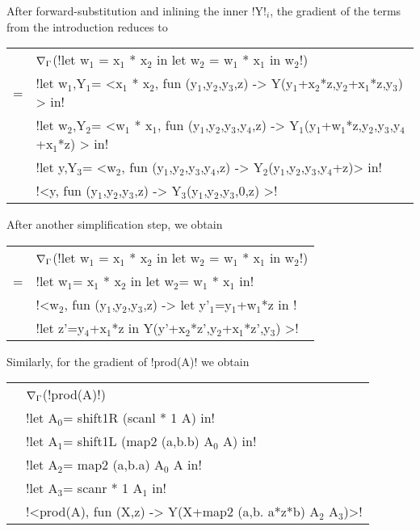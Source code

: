 \begin{example}
    After forward-substitution and inlining the inner !Y!$_{i}$, the gradient of the terms from the introduction reduces to

    \begin{tabular}{c l}
        & $\nabla_\Gamma$(!let w$_{1}$ = x$_{1}$ * x$_{2}$ in let w$_{2}$ = w$_{1}$ * x$_{1}$ in w$_{2}$!) \\
        =& !let w$_1$,Y$_1$= <x$_1$ * x$_{2}$, fun (y$_{1}$,y$_{2}$,y$_{3}$,z) -> Y(y$_{1}$+x$_2$*z,y$_{2}$+x$_1$*z,y$_{3}$) > in! \\
        & !let w$_{2}$,Y$_{2}$= <w$_{1}$ * x$_{1}$, fun (y$_{1}$,y$_{2}$,y$_{3}$,y$_{4}$,z) -> Y$_{1}$(y$_{1}$+w$_1$*z,y$_{2}$,y$_{3}$,y$_{4}$+x$_{1}$*z) > in! \\
        & !let y,Y$_{3}$= <w$_{2}$, fun (y$_{1}$,y$_{2}$,y$_{3}$,y$_{4}$,z) -> Y$_{2}$(y$_{1}$,y$_{2}$,y$_{3}$,y$_{4}$+z)> in! \\
        & !<y, fun (y$_{1}$,y$_{2}$,y$_{3}$,z) -> Y$_{3}$(y$_{1}$,y$_{2}$,y$_{3}$,0,z) >!
    \end{tabular}

After another simplification step, we obtain 

\begin{tabular}{c l}
    & $\nabla_\Gamma$(!let w$_{1}$ = x$_{1}$ * x$_{2}$ in let w$_{2}$ = w$_{1}$ * x$_{1}$ in w$_{2}$!) \\
    =& !let w$_1$= x$_1$ * x$_{2}$ in let w$_{2}$= w$_{1}$ * x$_{1}$ in! \\
        & !<w$_{2}$, fun (y$_{1}$,y$_{2}$,y$_{3}$,z) -> let y'$_{1}$=y$_{1}$+w$_1$*z in !\\
        & \quad\quad\quad!let z'=y$_4$+x$_1$*z in Y(y'+x$_2$*z',y$_{2}$+x$_1$*z',y$_{3}$) >!
\end{tabular}

Similarly, for the gradient of !prod(A)! we obtain

\begin{tabular}{c l}
        & $\nabla_\Gamma$(!prod(A)!) \\
        & !let A$_{0}$= shift1R (scanl * 1 A) in!\\
        & !let A$_{1}$= shift1L (map2 (a,b.b) A$_{0}$ A) in!\\
        & !let A$_{2}$= map2 (a,b.a) A$_{0}$ A in!\\
        & !let A$_{3}$= scanr * 1 A$_{1}$ in!\\
        & !<prod(A), fun (X,z) -> Y(X+map2 (a,b. a*z*b) A$_{2}$ A$_{3}$)>! 
    \end{tabular}
\end{example}

